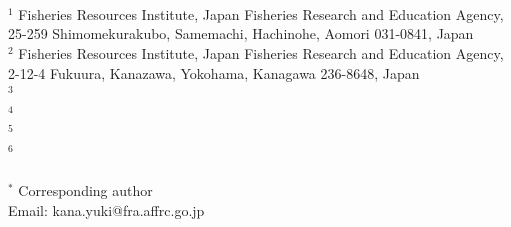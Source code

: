 \documentclass[12pt]{article}
\begin{document}
\setcounter{page}{1}
\renewcommand\citeleft{(} 
\renewcommand\citeright{)}

\\
\\
\ \\
$^{1}$ Fisheries Resources Institute, Japan Fisheries Research and Education Agency, 25-259 Shimomekurakubo, Samemachi, Hachinohe, Aomori 031-0841, Japan\\
$^{2}$ Fisheries Resources Institute, Japan Fisheries Research and Education Agency, 2-12-4 Fukuura, Kanazawa, Yokohama, Kanagawa 236-8648, Japan\\
$^{3}$ \\
$^{4}$ \\
$^{5}$ \\
$^{6}$ \\
\ \\

$^{\ast}$ Corresponding author\\
Email: kana.yuki@fra.affrc.go.jp

\newpage
{}

\\
\end{document}
